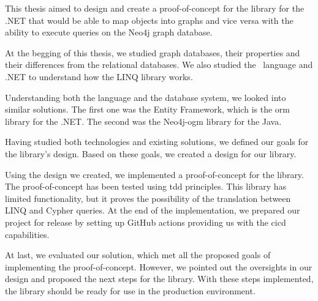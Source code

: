 \begin{conclusion}

    This thesis aimed to design and create a proof-of-concept for the library for the .NET that would be able to map objects into graphs and vice versa with the ability to execute queries on the Neo4j graph database.

    At the begging of this thesis, we studied graph databases, their properties and their differences from the relational databases.
    We also studied the \CS\ language and .NET to understand how the LINQ library works.

    Understanding both the language and the database system, we looked into similar solutions. The first one was the Entity Framework, which is the \acrshort{orm} library for the .NET.
    The second was the Neo4j-\acrshort{ogm} library for the Java.

    Having studied both technologies and existing solutions, we defined our goals for the library's design.
    Based on these goals, we created a design for our library.

    Using the design we created, we implemented a proof-of-concept for the library.
    The proof-of-concept has been tested using \acrshort{tdd} principles.
    This library has limited functionality, but it proves the possibility of the translation between LINQ and Cypher queries.
    At the end of the implementation, we prepared our project for release by setting up GitHub actions providing us with the \acrshort{cicd} capabilities.

    \pagebreak

    At last, we evaluated our solution, which met all the proposed goals of implementing the proof-of-concept.
    However, we pointed out the oversights in our design and proposed the next steps for the library.
    With these steps implemented, the library should be ready for use in the production environment.


\end{conclusion}